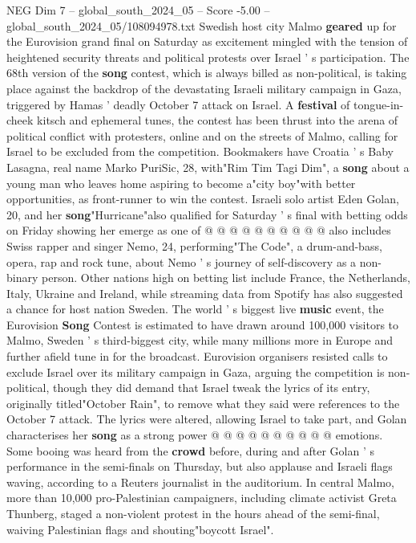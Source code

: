 \begin{textsample}{NEG Dim 7 – global\_south\_2024\_05 – Score -5.00 – global\_south\_2024\_05/108094978.txt}  \label{ex:f7_neg_390}
Swedish host city Malmo \textbf{geared} up for the Eurovision grand final on Saturday as excitement mingled with the tension of heightened security threats and political protests over Israel ' s participation.
The 68th version of the \textbf{song} contest, which is always billed as non-political, is taking place against the backdrop of the devastating Israeli military campaign in Gaza, triggered by Hamas ' deadly October 7 attack on Israel.
A \textbf{festival} of tongue-in-cheek kitsch and ephemeral tunes, the contest has been thrust into the arena of political conflict with protesters, online and on the streets of Malmo, calling for Israel to be excluded from the competition.
Bookmakers have Croatia ' s Baby Lasagna, real name Marko PuriSic, 28, with"Rim Tim Tagi Dim", a \textbf{song} about a young man who leaves home aspiring to become a"city boy"with better opportunities, as front-runner to win the contest.
Israeli solo artist Eden Golan, 20, and her \textbf{song}"Hurricane"also qualified for Saturday ' s final with betting odds on Friday showing her emerge as one of @ @ @ @ @ @ @ @ @ @ also includes Swiss rapper and singer Nemo, 24, performing"The Code", a drum-and-bass, opera, rap and rock tune, about Nemo ' s journey of self-discovery as a non-binary person.
Other nations high on betting list include France, the Netherlands, Italy, Ukraine and Ireland, while streaming data from Spotify has also suggested a chance for host nation Sweden.
The world ' s biggest live \textbf{music} event, the Eurovision \textbf{Song} Contest is estimated to have drawn around 100,000 visitors to Malmo, Sweden ' s third-biggest city, while many millions more in Europe and further afield tune in for the broadcast.
Eurovision organisers resisted calls to exclude Israel over its military campaign in Gaza, arguing the competition is non-political, though they did demand that Israel tweak the lyrics of its entry, originally titled"October Rain", to remove what they said were references to the October 7 attack.
The lyrics were altered, allowing Israel to take part, and Golan characterises her \textbf{song} as a strong power @ @ @ @ @ @ @ @ @ @ emotions.
Some booing was heard from the \textbf{crowd} before, during and after Golan ' s performance in the semi-finals on Thursday, but also applause and Israeli flags waving, according to a Reuters journalist in the auditorium.
In central Malmo, more than 10,000 pro-Palestinian campaigners, including climate activist Greta Thunberg, staged a non-violent protest in the hours ahead of the semi-final, waiving Palestinian flags and shouting"boycott Israel".

\end{textsample}
